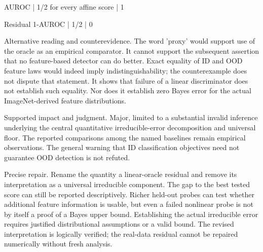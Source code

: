 \documentclass[10pt]{article}
\begin{document}
AUROC | 1/2 for every affine score | 1\par
Residual 1-AUROC | 1/2 | 0\par
Alternative reading and counterevidence. The word ’proxy’ would support use of the oracle as an empirical comparator. It cannot support the subsequent assertion that no feature-based detector can do better. Exact equality of ID and OOD feature laws would indeed imply indistinguishability; the counterexample does not dispute that statement. It shows that failure of a linear discriminator does not establish such equality. Nor does it establish zero Bayes error for the actual ImageNet-derived feature distributions.\par
Supported impact and judgment. Major, limited to a substantial invalid inference underlying the central quantitative irreducible-error decomposition and universal floor. The reported comparisons among the named baselines remain empirical observations. The general warning that ID classification objectives need not guarantee OOD detection is not refuted.\par
Precise repair. Rename the quantity a linear-oracle residual and remove its interpretation as a universal irreducible component. The gap to the best tested score can still be reported descriptively. Richer held-out probes can test whether additional feature information is usable, but even a failed nonlinear probe is not by itself a proof of a Bayes upper bound. Establishing the actual irreducible error requires justified distributional assumptions or a valid bound. The revised interpretation is logically verified; the real-data residual cannot be repaired numerically without fresh analysis.\par
\end{document}
